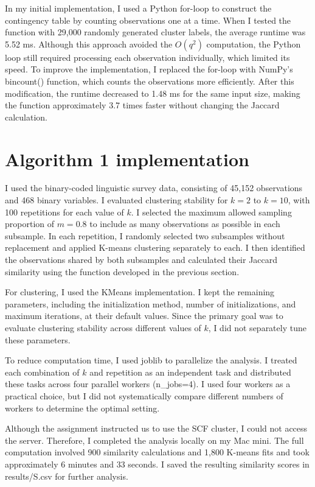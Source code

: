 \documentclass[10pt,letterpaper]{article}
\begin{document}
In my initial implementation, I used a Python for-loop to construct the contingency table by counting observations one at a time. When I tested the function with 29,000 randomly generated cluster labels, the average runtime was 5.52 ms. Although this approach avoided the $O(q^2)$ computation, the Python loop still required processing each observation individually, which limited its speed. To improve the implementation, I replaced the for-loop with NumPy's bincount() function, which counts the observations more efficiently. After this modification, the runtime decreased to 1.48 ms for the same input size, making the function approximately 3.7 times faster without changing the Jaccard calculation.

\section{Algorithm 1 implementation}

I used the binary-coded linguistic survey data, consisting of 45,152 observations and 468 binary variables. I evaluated clustering stability for $k=2$ to $k=10$, with 100 repetitions for each value of $k$. I selected the maximum allowed sampling proportion of $m=0.8$ to include as many observations as possible in each subsample. In each repetition, I randomly selected two subsamples without replacement and applied K-means clustering separately to each. I then identified the observations shared by both subsamples and calculated their Jaccard similarity using the function developed in the previous section.

For clustering, I used the KMeans implementation. I kept the remaining parameters, including the initialization method, number of initializations, and maximum iterations, at their default values. Since the primary goal was to evaluate clustering stability across different values of $k$, I did not separately tune these parameters.

To reduce computation time, I used joblib to parallelize the analysis. I treated each combination of $k$ and repetition as an independent task and distributed these tasks across four parallel workers (n\_jobs=4). I used four workers as a practical choice, but I did not systematically compare different numbers of workers to determine the optimal setting.

Although the assignment instructed us to use the SCF cluster, I could not access the server. Therefore, I completed the analysis locally on my Mac mini. The full computation involved 900 similarity calculations and 1,800 K-means fits and took approximately 6 minutes and 33 seconds. I saved the resulting similarity scores in results/S.csv for further analysis.
\end{document}

